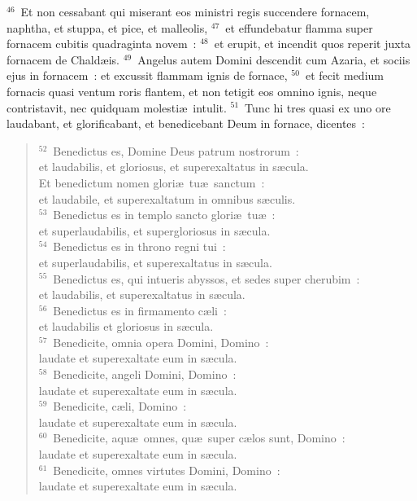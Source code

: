 ${}^{46}$~Et non cessabant qui miserant eos ministri regis succendere fornacem, naphtha, et stuppa, et pice, et malleolis,
${}^{47}$~et effundebatur flamma super fornacem cubitis quadraginta novem~:
${}^{48}$~et erupit, et incendit quos reperit juxta fornacem de Chald\ae is.
${}^{49}$~Angelus autem Domini descendit cum Azaria, et sociis ejus in fornacem~: et excussit flammam ignis de fornace,
${}^{50}$~et fecit medium fornacis quasi ventum roris flantem, et non tetigit eos omnino ignis, neque contristavit, nec quidquam molesti\ae\ intulit.
${}^{51}$~Tunc hi tres quasi ex uno ore laudabant, et glorificabant, et benedicebant Deum in fornace, dicentes~:
\begin{verse}${}^{52}$~Benedictus es, Domine Deus patrum nostrorum~:\\ et laudabilis, et gloriosus, et superexaltatus in s\ae cula.\\ Et benedictum nomen glori\ae\ tu\ae\ sanctum~:\\ et laudabile, et superexaltatum in omnibus s\ae culis.\\
${}^{53}$~Benedictus es in templo sancto glori\ae\ tu\ae~:\\ et superlaudabilis, et supergloriosus in s\ae cula.\\
${}^{54}$~Benedictus es in throno regni tui~:\\ et superlaudabilis, et superexaltatus in s\ae cula.\\
${}^{55}$~Benedictus es, qui intueris abyssos, et sedes super cherubim~:\\ et laudabilis, et superexaltatus in s\ae cula.\\
${}^{56}$~Benedictus es in firmamento c\ae li~:\\ et laudabilis et gloriosus in s\ae cula.\\
${}^{57}$~Benedicite, omnia opera Domini, Domino~:\\ laudate et superexaltate eum in s\ae cula.\\
${}^{58}$~Benedicite, angeli Domini, Domino~:\\ laudate et superexaltate eum in s\ae cula.\\
${}^{59}$~Benedicite, c\ae li, Domino~:\\ laudate et superexaltate eum in s\ae cula.\\
${}^{60}$~Benedicite, aqu\ae\ omnes, qu\ae\ super c\ae los sunt, Domino~:\\ laudate et superexaltate eum in s\ae cula.\\
${}^{61}$~Benedicite, omnes virtutes Domini, Domino~:\\ laudate et superexaltate eum in s\ae cula.\\

\end{verse}
